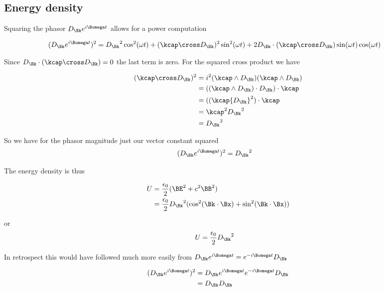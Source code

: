 \documentclass[]{eliblog}
\begin{document}
\subsection{Energy density}

Squaring the phasor $D_\Bk e^{i\Bomega t}$ allows for a power computation

\begin{align*}
(D_\Bk e^{i\Bomega t} )^2
&=
{D_\Bk}^2 \cos^2(\omega t) + (\kcap \cross D_\Bk)^2 \sin^2(\omega t) + 2 D_\Bk \cdot (\kcap \cross D_\Bk) \sin(\omega t) \cos(\omega t)
\end{align*}

Since $D_\Bk \cdot (\kcap \cross D_\Bk) = 0$ the last term is zero.  For the squared cross product we have

\begin{align*}
(\kcap \cross D_\Bk)^2
&= i^2 
(\kcap \wedge D_\Bk) (\kcap \wedge D_\Bk) \\
&= 
((\kcap \wedge D_\Bk) \cdot D_\Bk ) \cdot \kcap  \\
&= 
((\kcap {D_\Bk}^2 ) \cdot \kcap  \\
&= 
\kcap^2 {D_\Bk}^2  \\
&= 
{D_\Bk}^2 
\end{align*}

So we have for the phasor magnitude just our vector constant squared
\begin{align}
(D_\Bk e^{i\Bomega t} )^2
&= 
{D_\Bk}^2 
\end{align}

The energy density is thus

\begin{align*}
U 
&= \frac{\epsilon_0}{2}(\BE^2 + c^2 \BB^2) \\
&= \frac{\epsilon_0}{2} {D_\Bk}^2 ( \cos^2(\Bk \cdot \Bx) +\sin^2(\Bk \cdot \Bx) )
\end{align*}

or
\begin{align}
U &= \frac{\epsilon_0}{2} {D_\Bk}^2 
\end{align}

In retrospect this would have followed much more easily from $D_\Bk e^{i\Bomega t} = e^{-i\Bomega t} D_\Bk$

\begin{align*}
(D_\Bk e^{i\Bomega t} )^2
&=
D_\Bk e^{i\Bomega t} e^{-i\Bomega t} D_\Bk \\
&=
D_\Bk D_\Bk \\
\end{align*}
\end{document}
